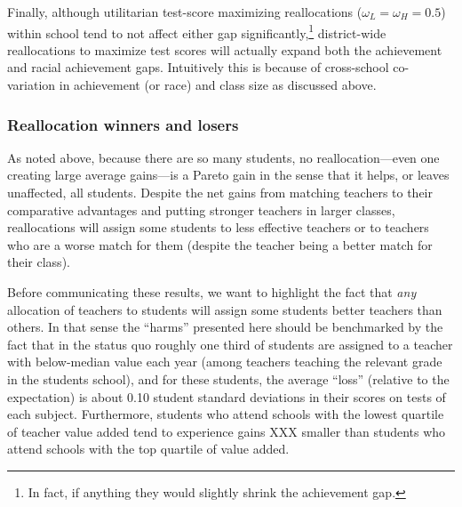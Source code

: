 \documentclass[12pt]{article}
\theoremstyle{definition}
\theoremstyle{definition}
\theoremstyle{definition}
\theoremstyle{definition}
\begin{document}
Finally, although utilitarian test-score maximizing reallocations ($\omega_L=\omega_H=0.5$) within school tend to not affect either gap significantly,\footnote{In fact, if anything they would slightly shrink the achievement gap.} district-wide reallocations to maximize test scores will actually expand both the achievement and racial achievement gaps. Intuitively this is because of cross-school co-variation in achievement (or race) and class size as discussed above.


\subsubsection{Reallocation winners and losers}

As noted above, because there are so many students, no reallocation---even one creating large average gains---is a Pareto gain in the sense that it helps, or leaves unaffected, all students. Despite the net gains from matching teachers to their comparative advantages and putting stronger teachers in larger classes, reallocations will assign some students to less effective teachers or to teachers who are a worse match for them (despite the teacher being a better match for their class). 

Before communicating these results, we want to highlight the fact that \textit{any} allocation of teachers to students will assign some students better teachers than others. In that sense the ``harms'' presented here should be benchmarked by the fact that in the status quo roughly one third of students are assigned to a teacher with below-median value each year (among teachers teaching the relevant grade in the students school), and for these students, the average ``loss'' (relative to the expectation) is about 0.10 student standard deviations in their scores on tests of each subject. Furthermore, students who attend schools with the lowest quartile of teacher value added tend to experience gains XXX smaller than students who attend schools with the top quartile of value added.
\end{document}
